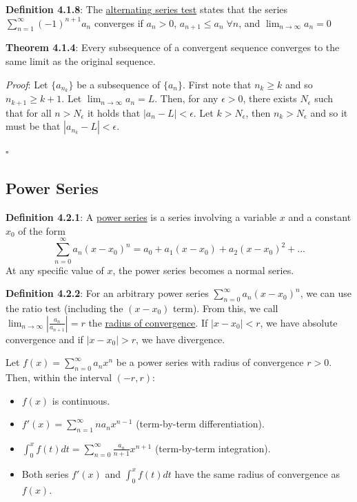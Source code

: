 \documentclass{article}
\newcommand{\separate}[1] {\vspace{#1 pt}\noindent}
\newcommand{\definition}[2]{\textbf{Definition #1}: #2\label{def:#1}}
\newcommand{\proof}[2]{\textit{Proof}: #2 \begin{flushright}\(\square\)\end{flushright}\label{prf:#1}}
\newcommand{\theorem}[3]{\textbf{Theorem #1}: #2 \par\separate{3}\proof{thm:#1}{#3}\label{thm:#1}}
\begin{document}
\newpage\noindent\definition{4.1.8}{The \underline{alternating series test} states that the series \(\sum_{n=1}^{\infty}(-1)^{n+1}a_n\) converges if \(a_n > 0\), \(a_{n+1} \leq a_n\;\forall n\), and \(\lim_{n\rightarrow\infty}a_n = 0\)}

\separate{7}\theorem{4.1.4}{Every subsequence of a convergent sequence converges to the same limit as the original sequence.}
{Let \(\{a_{n_k}\}\) be a subsequence of \(\{a_n\}\). First note that \(n_k \geq k\) and so \(n_{k+1} \geq k + 1\). Let \(\lim_{n\rightarrow\infty}a_n = L\). Then, for any \(\epsilon > 0\), there exists \(N_\epsilon\) such that for all \(n > N_\epsilon\) it holds that \(|a_n-L|<\epsilon\). Let \(k > N_\epsilon\), then \(n_k > N_\epsilon\) and so it must be that \(|a_{n_k} - L| < \epsilon\).}

\subsection{Power Series}

\definition{4.2.1}{A \underline{power series} is a series involving a variable \(x\) and a constant \(x_0\) of the form
\begin{equation}
    \sum^\infty_{n=0}a_n(x-x_0)^n = a_0 + a_1(x-x_0) + a_2(x-x_0)^2 + ...
\end{equation}
At any specific value of \(x\), the power series becomes a normal series.}

\separate{7}\definition{4.2.2}{For an arbitrary power series \(\sum_{n=0}^{\infty}a_n(x-x_0)^n\), we can use the ratio test (including the \((x-x_0)\) term). From this, we call \(\lim_{n\rightarrow\infty}\left|\frac{a_n}{a_{n+1}}\right| = r\) the \underline{radius of convergence}. If \(|x-x_0| < r\), we have absolute convergence and if \(|x-x_0| > r\), we have divergence.}

\separate{7}Let \(f(x) = \sum_{n=0}^{\infty} a_nx^n\) be a power series with radius of convergence \(r > 0\). Then, within the interval \((-r,r)\):
\begin{itemize}
    \item \(f(x)\) is continuous.
    \item \(f'(x) = \sum_{n=1}^{\infty} na_nx^{n-1}\) (term-by-term differentiation).
    \item \(\int_{0}^{x} f(t) dt = \sum_{n=0}^{\infty} \frac{a_n}{n+1}x^{n+1}\) (term-by-term integration).
    \item Both series \(f'(x)\) and \(\int_{0}^{x}f(t) dt\) have the same radius of convergence as \(f(x)\).
\end{itemize}
\end{document}
